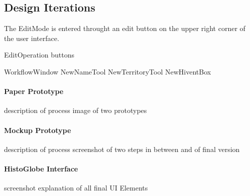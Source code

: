 


\subsection{Design Iterations} %
\label{sub:design_iterations}

The EditMode is entered throught an edit button on the upper right corner of the user interface.

EditOperation buttons

WorkflowWindow
NewNameTool
NewTerritoryTool
NewHiventBox

\paragraph{Paper Prototype} %
\label{par:paper_prototype}

description of process
image of two prototypes


\paragraph{Mockup Prototype} %
\label{par:mockup_prototype}

description of process
screenshot of two steps in between and of final version


\paragraph{HistoGlobe Interface} %
\label{par:histoglobe_interface}

screenshot
explanation of all final UI Elements





